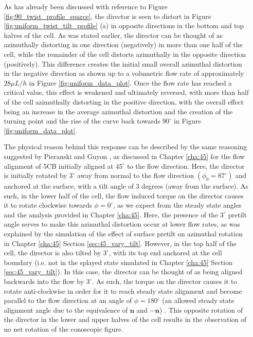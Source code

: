 As has already been discussed with reference to Figure \ref{fig:90_twist_profile_sparce}, the director is seen to distort in Figure \ref{fig:uniform_twist_tilt_profile} (a) in opposite directions in the bottom and top halves of the cell. As was stated earlier, the director can be thought of as azimuthally distorting in one direction (negatively) in more than one half of the cell, while the remainder of the cell distorts azimuthally in the opposite direction (positively). This difference creates the initial small overall azimuthal distortion in the negative direction as shown up to a volumetric flow rate of approximately $28 \mu L/h$ in Figure \ref{fig:uniform_data_plot}. Once the flow rate has reached a critical value, this effect is weakened and ultimately reversed, with more than half of the cell azimuthally distorting in the positive direction, with the overall effect being an increase in the average azimuthal distortion and the creation of the turning point and the rise of the curve back towards $90^{\circ}$ in Figure \ref{fig:uniform_data_plot}.

The physical reason behind this response can be described by the same reasoning suggested by Pieranski and Guyon \cite{Pieranski1974}, as discussed in Chapter \ref{cha:45} for the flow alignment of 5CB initially aligned at $45^{\circ}$ to the flow direction. Here, the director is initially rotated by $3^{\circ}$ away from normal to the flow direction $\left(\phi_0=87^{\circ}\right)$ and anchored at the surface, with a tilt angle of 3 degrees (away from the surface). As such, in the lower half of the cell, the flow induced torque on the director causes it to rotate clockwise towards $\phi=0^{\circ}$, as we expect from the steady state angles and the analysis provided in Chapter \ref{cha:45}. Here, the presence of the $3^{\circ}$ pretilt angle serves to make this azimuthal distortion occur at lower flow rates, as was explained by the simulation of the effect of surface pretilt on azimuthal rotation in Chapter \ref{cha:45} Section \ref{sec:45_vary_tilt}. However, in the top half of the cell, the director is also tilted by $3^{\circ}$, with its top end anchored at the cell boundary (i.e. not in the splayed state simulated in Chapter \ref{cha:45} Section \ref{sec:45_vary_tilt}). In this case, the director can be thought of as being aligned backwards into the flow by $3^{\circ}$. As such, the torque on the director causes it to rotate anti-clockwise in order for it to reach steady state alignment and become parallel to the flow direction at an angle of $\phi=180^{\circ}$ (an allowed steady state alignment angle due to the equivalence of $\mathbf{n}$ and $\mathbf{-n}$) \cite{Horn2003}. This opposite rotation of the director in the lower and upper halves of the cell results in the observation of no net rotation of the conoscopic figure.

